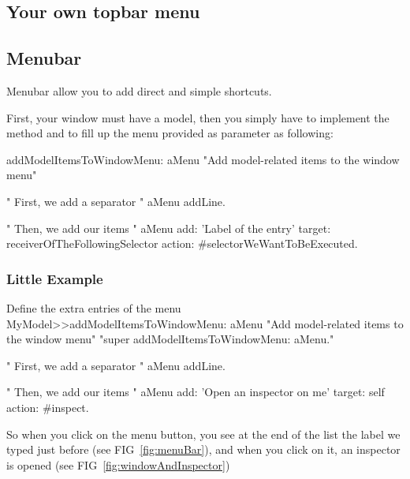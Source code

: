 \documentclass[a4paper,10pt,twoside]{book}
\begin{document}
\subsection{Your own topbar menu}

\subsection{Menubar}

Menubar allow you to add direct and simple shortcuts.

First, your window must have a model, then you simply have to implement the method \ct{} and to fill up the menu provided as parameter as following:

\begin{method}{}

addModelItemsToWindowMenu: aMenu
	"Add model-related items to the window menu"
	
	" First, we add a separator "
	aMenu addLine.
	
	" Then, we add our items "
	aMenu
		add: 'Label of the entry'
		target: receiverOfTheFollowingSelector
		action: #selectorWeWantToBeExecuted.

\end{method} 

\subsubsection{Little Example}

\begin{method}{Define the extra entries of the menu}
MyModel>>addModelItemsToWindowMenu: aMenu
	"Add model-related items to the window menu"
	"super addModelItemsToWindowMenu: aMenu."
	
	" First, we add a separator "
	aMenu addLine.
	
	" Then, we add our items "
	aMenu
		add: 'Open an inspector on me'
		target: self
		action: #inspect.
\end{method} 

So when you click on the menu button, you see at the end of the list the label we typed just before (see FIG~\ref{fig:menuBar}), and when you click on it, an inspector is opened (see FIG~\ref{fig:windowAndInspector})
\end{document}

